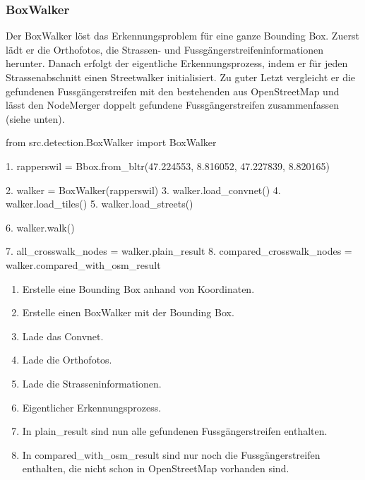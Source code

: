 \subsubsection{BoxWalker}
Der BoxWalker löst das Erkennungsproblem für eine ganze Bounding Box. Zuerst lädt er die Orthofotos, die Strassen- und Fussgängerstreifeninformationen herunter. Danach erfolgt der eigentliche Erkennungsprozess, indem er für jeden Strassenabschnitt einen Streetwalker initialisiert. Zu guter Letzt vergleicht er die gefundenen Fussgängerstreifen mit den bestehenden aus OpenStreetMap und lässt den NodeMerger doppelt gefundene Fussgängerstreifen zusammenfassen (siehe unten).
\\
\begin{python}
	from src.detection.BoxWalker import BoxWalker
	
	1. rapperswil = Bbox.from_bltr(47.224553, 8.816052, 47.227839, 8.820165)
	
	2. walker = BoxWalker(rapperswil)
	3. walker.load_convnet()
	4. walker.load_tiles()
	5. walker.load_streets()
	
	6. walker.walk()
	
	7. all_crosswalk_nodes = walker.plain_result
	8. compared_crosswalk_nodes = walker.compared_with_osm_result
\end{python}
\begin{enumerate}
	\item Erstelle eine Bounding Box anhand von Koordinaten.
	\item Erstelle einen BoxWalker mit der Bounding Box.
	\item Lade das Convnet.
	\item Lade die Orthofotos.
	\item Lade die Strasseninformationen.
	\item Eigentlicher Erkennungsprozess.
	\item In plain\_result sind nun alle gefundenen Fussgängerstreifen enthalten.
	\item In compared\_with\_osm\_result sind nur noch die Fussgängerstreifen enthalten, die nicht schon in OpenStreetMap vorhanden sind.
\end{enumerate}

